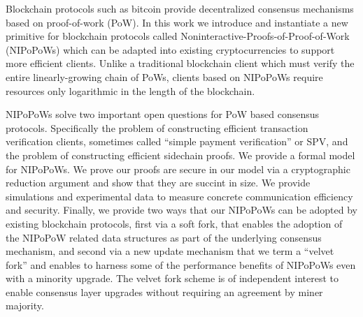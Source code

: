 Blockchain protocols such as bitcoin provide decentralized consensus
mechanisms based on proof-of-work (PoW).
%
In this work we introduce and instantiate a new primitive for blockchain protocols called Noninteractive-Proofs-of-Proof-of-Work (NIPoPoWs) which can be adapted into existing cryptocurrencies to support more efficient clients.
Unlike a traditional blockchain client which must verify the entire
linearly-growing chain of PoWs, clients based on NIPoPoWs require resources
only logarithmic in the length of the blockchain.

NIPoPoWs solve two important open questions for PoW based consensus
protocols. Specifically the problem  
of constructing efficient transaction verification clients, sometimes called
``simple payment verification'' or SPV, and the problem of constructing
efficient sidechain proofs. 
%
%
We provide a formal model for NIPoPoWs. We prove our proofs are secure in our
model via a cryptographic reduction argument and show that they are succint in size. We provide
simulations and experimental data to measure concrete communication efficiency
and security. 
Finally, we provide two ways that our NIPoPoWs can be adopted by
existing blockchain protocols, first via a soft fork, that enables the 
adoption of the NIPoPoW related data structures
as part of the underlying consensus mechanism, 
and second via a new update mechanism 
that we term a ``velvet fork'' and enables to harness some of
the performance benefits of NIPoPoWs even with a minority upgrade. The
velvet fork scheme is of independent interest to enable consensus layer
upgrades without requiring an agreement by miner majority.


